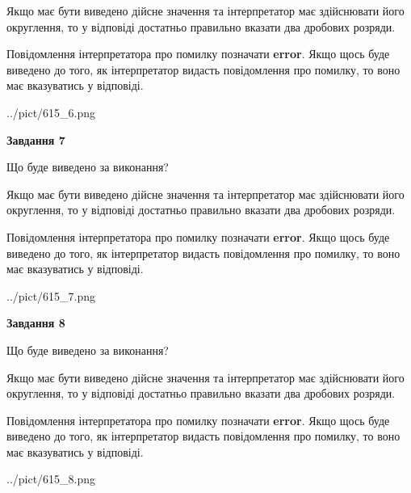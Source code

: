 \documentclass[12pt, ukrainian]{article}
\begin{document}
{\begin {Large}
Якщо має бути виведено дійсне значення та інтерпретатор має здійснювати його округлення, 
то у відповіді достатньо правильно вказати два дробових розряди.

Повідомлення інтерпретатора про помилку позначати \textbf{error}.
Якщо щось буде виведено до того, як інтерпретатор видасть повідомлення про помилку, 
то воно має вказуватись у відповіді. \par

\begin{center}
	{../pict/615_6.png}
\end{center}
\newpage

{\begin {center}\textbf{Завдання 7}\end {center}}\par
Що буде виведено за виконання? \par

Якщо має бути виведено дійсне значення та інтерпретатор має здійснювати його округлення, 
то у відповіді достатньо правильно вказати два дробових розряди.

Повідомлення інтерпретатора про помилку позначати \textbf{error}.
Якщо щось буде виведено до того, як інтерпретатор видасть повідомлення про помилку, 
то воно має вказуватись у відповіді. \par

\begin{center}
	{../pict/615_7.png}
\end{center}
\newpage

{\begin {center}\textbf{Завдання 8}\end {center}}\par
Що буде виведено за виконання? \par

Якщо має бути виведено дійсне значення та інтерпретатор має здійснювати його округлення, 
то у відповіді достатньо правильно вказати два дробових розряди.

Повідомлення інтерпретатора про помилку позначати \textbf{error}.
Якщо щось буде виведено до того, як інтерпретатор видасть повідомлення про помилку, 
то воно має вказуватись у відповіді. \par

\begin{center}
	{../pict/615_8.png}
\end{center}
\newpage


\end{Large}}
\end{document}
